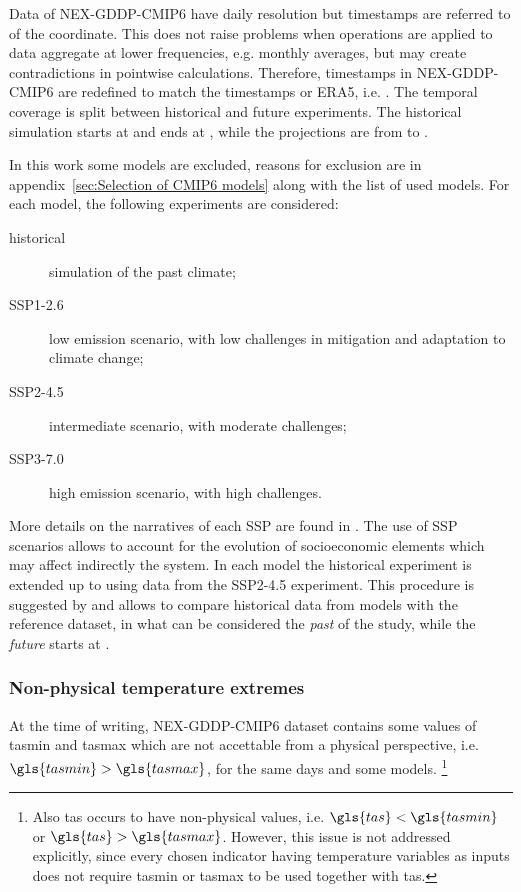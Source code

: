 Data of NEX-GDDP-CMIP6 have daily resolution but timestamps are referred to  of the coordinate. This does not raise problems when operations are applied to data aggregate at lower frequencies, e.g. monthly averages, but may create contradictions in pointwise calculations. Therefore, timestamps in NEX-GDDP-CMIP6 are redefined to match the timestamps or ERA5, i.e. .
The temporal coverage is split between historical and future experiments. The historical simulation starts at  and ends at , while the projections are from  to .

In this work some models are excluded, reasons for exclusion are in appendix~\ref{sec:Selection of CMIP6 models} along with the list of used models. For each model, the following experiments are considered:
\begin{description}
  \item[historical] simulation of the past climate;
  \item[SSP1-2.6] low emission scenario, with low challenges in mitigation and adaptation to climate change;
  \item[SSP2-4.5] intermediate scenario, with moderate challenges;
  \item[SSP3-7.0] high emission scenario, with high challenges.
\end{description}
More details on the narratives of each \gls{SSP} are found in \cite{2017ONeillTheRoads}. The use of SSP scenarios allows to account for the evolution of socioeconomic elements which may affect indirectly the system.
In each model the historical experiment is extended up to  using data from the SSP2-4.5 experiment. This procedure is suggested by \cite[1954]{2016EyringOverviewOf} and allows to compare historical data from models with the reference dataset, in what can be considered the \emph{past} of the study, while the \emph{future} starts at .



\subsubsection{Non-physical temperature extremes}
\label{sec:Non-physical temperature extremes}
At the time of writing, NEX-GDDP-CMIP6 dataset contains some values of \glsdesc{tasmin} and \glsdesc{tasmax} which are not accettable from a physical perspective, i.e. $\gls{tasmin} > \gls{tasmax}$, for the same days and some models.%
\footnote{Also \glsdesc{tas} occurs to have non-physical values, i.e. $\gls{tas} < \gls{tasmin}$ or $\gls{tas} > \gls{tasmax}$. However, this issue is not addressed explicitly, since every chosen indicator having temperature variables as inputs does not require \gls{tasmin} or \gls{tasmax} to be used together with \gls{tas}.}

